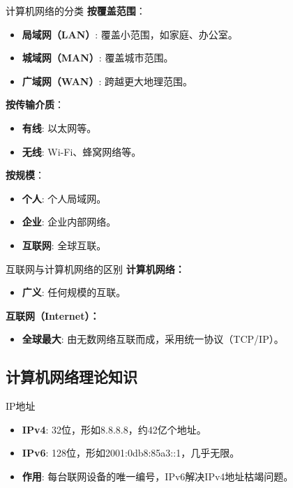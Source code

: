 \documentclass{beamer}
\begin{document}
\begin{frame}{计算机网络的分类}
\textbf{按覆盖范围}：
\begin{itemize}
    \item \textbf{局域网（LAN）}: 覆盖小范围，如家庭、办公室。
    \item \textbf{城域网（MAN）}: 覆盖城市范围。
    \item \textbf{广域网（WAN）}: 跨越更大地理范围。
\end{itemize}
\textbf{按传输介质}：
\begin{itemize}
    \item \textbf{有线}: 以太网等。
    \item \textbf{无线}: Wi-Fi、蜂窝网络等。
\end{itemize}
\textbf{按规模}：
\begin{itemize}
    \item \textbf{个人}: 个人局域网。
    \item \textbf{企业}: 企业内部网络。
    \item \textbf{互联网}: 全球互联。
\end{itemize}
\end{frame}

\begin{frame}{互联网与计算机网络的区别}
\textbf{计算机网络：}
\begin{itemize}
    \item \textbf{广义}: 任何规模的互联。
\end{itemize}
\textbf{互联网（Internet）：}
\begin{itemize}
    \item \textbf{全球最大}: 由无数网络互联而成，采用统一协议（TCP/IP）。
\end{itemize}
\end{frame}

\subsection{计算机网络理论知识}

\begin{frame}{IP地址}
\begin{itemize}
    \item \textbf{IPv4}: 32位，形如8.8.8.8，约42亿个地址。
    \item \textbf{IPv6}: 128位，形如2001:0db8:85a3::1，几乎无限。
    \item \textbf{作用}: 每台联网设备的唯一编号，IPv6解决IPv4地址枯竭问题。
\end{itemize}
\end{frame}
\end{document}
